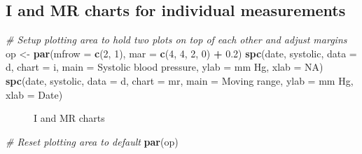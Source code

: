 \documentclass[
]{book}
\makeatletter
\newenvironment{Shaded}{\begin{snugshade}}{\end{snugshade}}
\newcommand{\AttributeTok}[1]{\textcolor[rgb]{0.13,0.29,0.53}{#1}}
\newcommand{\CommentTok}[1]{\textcolor[rgb]{0.56,0.35,0.01}{\textit{#1}}}
\newcommand{\ConstantTok}[1]{\textcolor[rgb]{0.56,0.35,0.01}{#1}}
\newcommand{\DecValTok}[1]{\textcolor[rgb]{0.00,0.00,0.81}{#1}}
\newcommand{\FloatTok}[1]{\textcolor[rgb]{0.00,0.00,0.81}{#1}}
\newcommand{\FunctionTok}[1]{\textcolor[rgb]{0.13,0.29,0.53}{\textbf{#1}}}
\newcommand{\NormalTok}[1]{#1}
\newcommand{\OtherTok}[1]{\textcolor[rgb]{0.56,0.35,0.01}{#1}}
\newcommand{\SpecialCharTok}[1]{\textcolor[rgb]{0.81,0.36,0.00}{\textbf{#1}}}
\newcommand{\StringTok}[1]{\textcolor[rgb]{0.31,0.60,0.02}{#1}}
\newcommand*\pandocbounded[1]{%
  \sbox\pandoc@box{#1}%
  \Gscale@div\@tempa{\textheight}{\dimexpr\ht\pandoc@box+\dp\pandoc@box\relax}%
  \Gscale@div\@tempb{\linewidth}{\wd\pandoc@box}%
  \ifdim\@tempb\p@<\@tempa\p@\let\@tempa\@tempb\fi%
  \ifdim\@tempa\p@<\p@\scalebox{\@tempa}{\usebox\pandoc@box}%
  \else\usebox{\pandoc@box}%
  \fi%
}
\makeatother
\begin{document}
\subsection{I and MR charts for individual
measurements}\label{i-and-mr-charts-for-individual-measurements}

\begin{Shaded}
\begin{Highlighting}[]
\CommentTok{\# Setup plotting area to hold two plots on top of each other and adjust margins}
\NormalTok{op }\OtherTok{\textless{}{-}} \FunctionTok{par}\NormalTok{(}\AttributeTok{mfrow =} \FunctionTok{c}\NormalTok{(}\DecValTok{2}\NormalTok{, }\DecValTok{1}\NormalTok{),}
          \AttributeTok{mar   =} \FunctionTok{c}\NormalTok{(}\DecValTok{4}\NormalTok{, }\DecValTok{4}\NormalTok{, }\DecValTok{2}\NormalTok{, }\DecValTok{0}\NormalTok{) }\SpecialCharTok{+} \FloatTok{0.2}\NormalTok{)}
\FunctionTok{spc}\NormalTok{(date, systolic, }
    \AttributeTok{data  =}\NormalTok{ d, }
    \AttributeTok{chart =} \StringTok{\textquotesingle{}i\textquotesingle{}}\NormalTok{,}
    \AttributeTok{main  =} \StringTok{\textquotesingle{}Systolic blood pressure\textquotesingle{}}\NormalTok{,}
    \AttributeTok{ylab  =} \StringTok{\textquotesingle{}mm Hg\textquotesingle{}}\NormalTok{,}
    \AttributeTok{xlab  =} \ConstantTok{NA}\NormalTok{)}
\FunctionTok{spc}\NormalTok{(date, systolic, }
    \AttributeTok{data  =}\NormalTok{ d, }
    \AttributeTok{chart =} \StringTok{\textquotesingle{}mr\textquotesingle{}}\NormalTok{,}
    \AttributeTok{main  =} \StringTok{\textquotesingle{}Moving range\textquotesingle{}}\NormalTok{,}
    \AttributeTok{ylab  =} \StringTok{\textquotesingle{}mm Hg\textquotesingle{}}\NormalTok{,}
    \AttributeTok{xlab  =} \StringTok{\textquotesingle{}Date\textquotesingle{}}\NormalTok{)}
\end{Highlighting}
\end{Shaded}

\begin{figure}
\centering
\pandocbounded{}
\caption{I and MR charts}
\end{figure}

\begin{Shaded}
\begin{Highlighting}[]
\CommentTok{\# Reset plotting area to default}
\FunctionTok{par}\NormalTok{(op)}
\end{Highlighting}
\end{Shaded}
\end{document}
